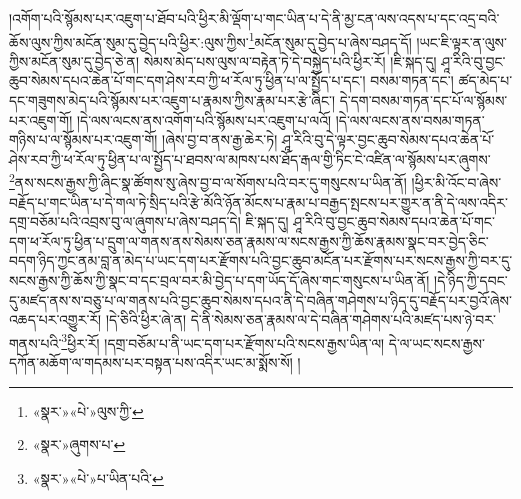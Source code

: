 །འགོག་པའི་སྙོམས་པར་འཇུག་པ་ཐོབ་པའི་ཕྱིར་མི་ལྡོག་པ་གང་ཡིན་པ་དེ་ནི་མྱ་ངན་ལས་འདས་པ་དང་འདྲ་བའི་ཆོས་ལུས་ཀྱིས་མངོན་སུམ་དུ་བྱེད་པའི་ཕྱིར་:ལུས་ཀྱིས་\footnote{«སྣར་»«པེ་»ལུས་ཀྱི་}མངོན་སུམ་དུ་བྱེད་པ་ཞེས་བཤད་དོ། །ཡང་ཇི་ལྟར་ན་ལུས་ཀྱིས་མངོན་སུམ་དུ་བྱེད་ཅེ་ན། སེམས་མེད་པས་ལུས་ལ་བརྟེན་ཏེ་དེ་བསྐྱེད་པའི་ཕྱིར་རོ། །ཇི་སྐད་དུ། ཤཱ་རིའི་བུ་བྱང་ཆུབ་སེམས་དཔའ་ཆེན་པོ་གང་དག་ཤེས་རབ་ཀྱི་ཕ་རོལ་ཏུ་ཕྱིན་པ་ལ་སྤྱོད་པ་དང་། བསམ་གཏན་དང་། ཚད་མེད་པ་དང་གཟུགས་མེད་པའི་སྙོམས་པར་འཇུག་པ་རྣམས་ཀྱིས་རྣམ་པར་རྩེ་ཞིང་། དེ་དག་བསམ་གཏན་དང་པོ་ལ་སྙོམས་པར་འཇུག་གོ། །དེ་ལས་ལངས་ནས་འགོག་པའི་སྙོམས་པར་འཇུག་པ་ལའོ། །དེ་ལས་ལངས་ནས་བསམ་གཏན་གཉིས་པ་ལ་སྙོམས་པར་འཇུག་གོ། །ཞེས་བྱ་བ་ནས་རྒྱ་ཆེར་ཏེ། ཤཱ་རིའི་བུ་དེ་ལྟར་བྱང་ཆུབ་སེམས་དཔའ་ཆེན་པོ་ཤེས་རབ་ཀྱི་ཕ་རོལ་ཏུ་ཕྱིན་པ་ལ་སྤྱོད་པ་ཐབས་ལ་མཁས་པས་ཐོད་རྒལ་གྱི་ཏིང་ངེ་འཛིན་ལ་སྙོམས་པར་ཞུགས་\footnote{«སྣར་»ཞུགས་པ་}ནས་སངས་རྒྱས་ཀྱི་ཞིང་སྣ་ཚོགས་སུ་ཞེས་བྱ་བ་ལ་སོགས་པའི་བར་དུ་གསུངས་པ་ཡིན་ནོ། །ཕྱིར་མི་འོང་བ་ཞེས་བརྗོད་པ་གང་ཡིན་པ་དེ་གལ་ཏེ་སྲིད་པའི་རྩེ་མོའི་ཉོན་མོངས་པ་རྣམ་པ་བརྒྱད་སྤངས་པར་གྱུར་ན་ནི་དེ་ལས་འདིར་དགྲ་བཅོམ་པའི་འབྲས་བུ་ལ་ཞུགས་པ་ཞེས་བཤད་དེ། ཇི་སྐད་དུ། ཤཱ་རིའི་བུ་བྱང་ཆུབ་སེམས་དཔའ་ཆེན་པོ་གང་དག་ཕ་རོལ་ཏུ་ཕྱིན་པ་དྲུག་ལ་གནས་ནས་སེམས་ཅན་རྣམས་ལ་སངས་རྒྱས་ཀྱི་ཆོས་རྣམས་སྣང་བར་བྱེད་ཅིང་བདག་ཉིད་ཀྱང་ནམ་བླ་ན་མེད་པ་ཡང་དག་པར་རྫོགས་པའི་བྱང་ཆུབ་མངོན་པར་རྫོགས་པར་སངས་རྒྱས་ཀྱི་བར་དུ་སངས་རྒྱས་ཀྱི་ཆོས་ཀྱི་སྣང་བ་དང་བྲལ་བར་མི་བྱེད་པ་དག་ཡོད་དོ་ཞེས་གང་གསུངས་པ་ཡིན་ནོ། །དེ་ཉིད་ཀྱི་དབང་དུ་མཛད་ནས་ས་བཅུ་པ་ལ་གནས་པའི་བྱང་ཆུབ་སེམས་དཔའ་ནི་དེ་བཞིན་གཤེགས་པ་ཉིད་དུ་བརྗོད་པར་བྱའོ་ཞེས་འཆད་པར་འགྱུར་རོ། །དེ་ཅིའི་ཕྱིར་ཞེ་ན། དེ་ནི་སེམས་ཅན་རྣམས་ལ་དེ་བཞིན་གཤེགས་པའི་མཛད་པས་ཉེ་བར་གནས་པའི་\footnote{«སྣར་»«པེ་»པ་ཡིན་པའི་}ཕྱིར་རོ། །དགྲ་བཅོམ་པ་ནི་ཡང་དག་པར་རྫོགས་པའི་སངས་རྒྱས་ཡིན་ལ། དེ་ལ་ཡང་སངས་རྒྱས་དཀོན་མཆོག་ལ་གདམས་པར་བསྟན་པས་འདིར་ཡང་མ་སྨོས་སོ། །
